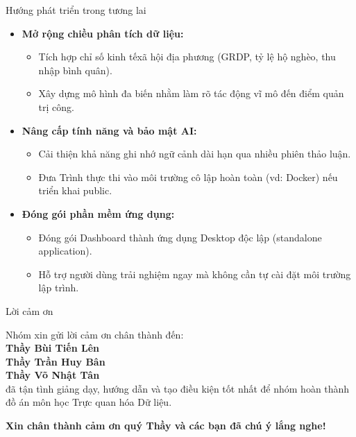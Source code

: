 \begin{frame}[t]{Hướng phát triển trong tương lai}
  \begin{itemize}
    \setlength{\itemsep}{12pt}
    \item \textbf{Mở rộng chiều phân tích dữ liệu:}
    \begin{itemize}
      \item Tích hợp chỉ số kinh tế\textendash xã hội địa phương (GRDP, tỷ lệ hộ nghèo, thu nhập bình quân).
      \item Xây dựng mô hình đa biến nhằm làm rõ tác động vĩ mô đến điểm quản trị công.
    \end{itemize}
    \item \textbf{Nâng cấp tính năng và bảo mật AI:}
    \begin{itemize}
      \item Cải thiện khả năng ghi nhớ ngữ cảnh dài hạn qua nhiều phiên thảo luận.
      \item Đưa Trình thực thi vào môi trường cô lập hoàn toàn (vd: Docker) nếu triển khai public.
    \end{itemize}
    \item \textbf{Đóng gói phần mềm ứng dụng:}
    \begin{itemize}
      \item Đóng gói Dashboard thành ứng dụng Desktop độc lập (standalone application).
      \item Hỗ trợ người dùng trải nghiệm ngay mà không cần tự cài đặt môi trường lập trình.
    \end{itemize}
  \end{itemize}
\end{frame}

\begin{frame}[t]{Lời cảm ơn}
  \vspace{1cm}
  \begin{center}
    Nhóm xin gửi lời cảm ơn chân thành đến:\\
    \vspace{0.5cm}
    \textbf{Thầy Bùi Tiến Lên}\\
    \textbf{Thầy Trần Huy Bân}\\
    \textbf{Thầy Võ Nhật Tân}\\
    \vspace{0.5cm}
    đã tận tình giảng dạy, hướng dẫn và tạo điều kiện tốt nhất để nhóm hoàn thành đồ án môn học Trực quan hóa Dữ liệu.
    
    \vspace{1cm}
    \Large \textbf{Xin chân thành cảm ơn quý Thầy và các bạn đã chú ý lắng nghe!}
  \end{center}
\end{frame}
